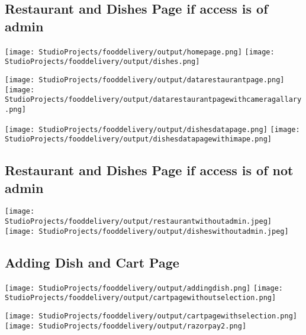 \vspace{15pt}

\subsection{Restaurant and Dishes Page if access is of admin}
\texttt{[image: StudioProjects/fooddelivery/output/homepage.png]}
\hfill
\texttt{[image: StudioProjects/fooddelivery/output/dishes.png]}

\vspace{10pt}

\texttt{[image: StudioProjects/fooddelivery/output/datarestaurantpage.png]}
\hfill
\texttt{[image: StudioProjects/fooddelivery/output/datarestaurantpagewithcameragallary.png]}

\vspace{10pt}

\texttt{[image: StudioProjects/fooddelivery/output/dishesdatapage.png]}
\hfill
\texttt{[image: StudioProjects/fooddelivery/output/dishesdatapagewithimape.png]}

\vspace{10pt}
\subsection{Restaurant and Dishes Page if access is of not admin}
\texttt{[image: StudioProjects/fooddelivery/output/restaurantwithoutadmin.jpeg]}
\hfill
\texttt{[image: StudioProjects/fooddelivery/output/disheswithoutadmin.jpeg]}



\vspace{10pt}

\subsection{Adding Dish and Cart Page}
\texttt{[image: StudioProjects/fooddelivery/output/addingdish.png]}
\hfill
\texttt{[image: StudioProjects/fooddelivery/output/cartpagewithoutselection.png]}

\vspace{15pt}

\texttt{[image: StudioProjects/fooddelivery/output/cartpagewithselection.png]}
\hfill
\texttt{[image: StudioProjects/fooddelivery/output/razorpay2.png]}



